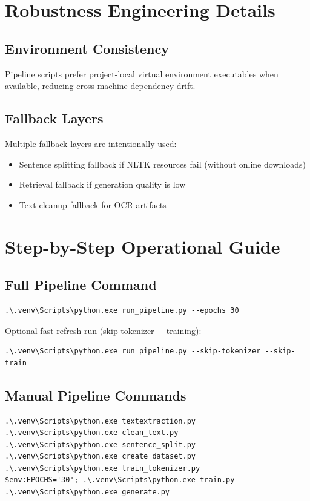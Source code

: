 \documentclass[a4paper,11pt]{article}
\begin{document}
\section{Robustness Engineering Details}
\subsection{Environment Consistency}
Pipeline scripts prefer project-local virtual environment executables when available, reducing cross-machine dependency drift.

\subsection{Fallback Layers}
Multiple fallback layers are intentionally used:
\begin{itemize}[leftmargin=1.5em]
    \item Sentence splitting fallback if NLTK resources fail (without online downloads)
    \item Retrieval fallback if generation quality is low
    \item Text cleanup fallback for OCR artifacts
\end{itemize}

\section{Step-by-Step Operational Guide}
\subsection{Full Pipeline Command}
\begin{verbatim}
.\.venv\Scripts\python.exe run_pipeline.py --epochs 30
\end{verbatim}

Optional fast-refresh run (skip tokenizer + training):
\begin{verbatim}
.\.venv\Scripts\python.exe run_pipeline.py --skip-tokenizer --skip-train
\end{verbatim}

\subsection{Manual Pipeline Commands}
\begin{verbatim}
.\.venv\Scripts\python.exe textextraction.py
.\.venv\Scripts\python.exe clean_text.py
.\.venv\Scripts\python.exe sentence_split.py
.\.venv\Scripts\python.exe create_dataset.py
.\.venv\Scripts\python.exe train_tokenizer.py
$env:EPOCHS='30'; .\.venv\Scripts\python.exe train.py
.\.venv\Scripts\python.exe generate.py
\end{verbatim}
\end{document}
